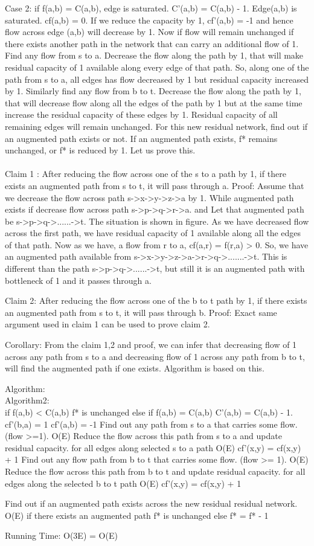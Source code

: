 	Case 2: if f(a,b) = C(a,b), edge is saturated. C'(a,b) = C(a,b) - 1. 
	Edge(a,b) is saturated. cf(a,b) = 0. If we reduce the capacity by 1, cf'(a,b) = -1 and hence flow across edge (a,b) will decrease by 1. Now if flow will remain unchanged if there exists another path in the network that can carry an additional flow of 1. 
	Find any flow from s to a. 
	Decrease the flow along the path by 1, that will make residual capacity of 1 available along every edge of that path. So, along one of the path from s to a, all edges has flow decreased by 1 but residual capacity increased by 1. 
	Similarly find any flow from b to t.
	Decrease the flow along the path by 1, that will decrease flow along all the edges of the path by 1 but at the same time increase the residual capacity of these edges by 1. 
	Residual capacity of all remaining edges will remain unchanged. 
	For this new residual network, find out if an augmented path exists or not.
	If an augmented path exists, f* remains unchanged, or f* is reduced by 1. 
	Let us prove this.	
	\\
	\\
	Claim 1 : After reducing the flow across one of the s to a path by 1, if there exists an augmented path from s to t, it will pass through a. 
	Proof:	
	Assume that we decrease the flow across path s->x->y->z->a by 1. While augmented path exists if decrease flow across path s->p->q->r->a. and Let that augmented path be s->p->q->......->t.
	The situation is shown in figure. 
	As we have decreased flow across the first path, we have residual capacity of 1 available along all the edges of that path. Now as we have, a flow from r to a, cf(a,r) = f(r,a) > 0. So, we have an augmented path available from s->x->y->z->a->r->q->.......->t. This is different than the path s->p->q->......->t, but still it is an augmented path with bottleneck of 1 and it passes through a. 
	
	
	Claim 2: After reducing the flow across one of the b to t path by 1, if there exists an augmented path from s to t, it will pass through b. 
	Proof: Exact same argument used in claim 1 can be used to prove claim 2. 
	
	Corollary: From the claim 1,2  and proof, we can infer that decreasing flow of 1 across any path from s to a and decreasing flow of 1 across any path from b to t,  will find the augmented path if one exists. Algorithm is based on this. 
	
	Algorithm:\\
	Algorithm2:\\
	if f(a,b) < C(a,b)
		f* is unchanged
	else if f(a,b) = C(a,b)
		C'(a,b) = C(a,b) - 1.
		cf'(b,a) = 1	
		cf'(a,b) = -1	
		Find out any path from s to a that carries some flow. (flow >=1). O(E)
		Reduce the flow across this path from s to a and update residual capacity. 
		for all edges along selected s to a path O(E)
			cf'(x,y) = cf(x,y) + 1		
		Find out any flow path from b to t that carries some flow. (flow >= 1). O(E)
		Reduce the flow across this path from b to t and update residual capacity.
		for all edges along the selected b to t path O(E)
			cf'(x,y) = cf(x,y) + 1
		
		Find out if an augmented path exists across the new residual  residual network. O(E)
		if there exists an augmented path
			f* is unchanged
		else
			f* = f* - 1
			

	Running Time: O(3E) = O(E)		
			 		

		
	
	
	
					
	
	

